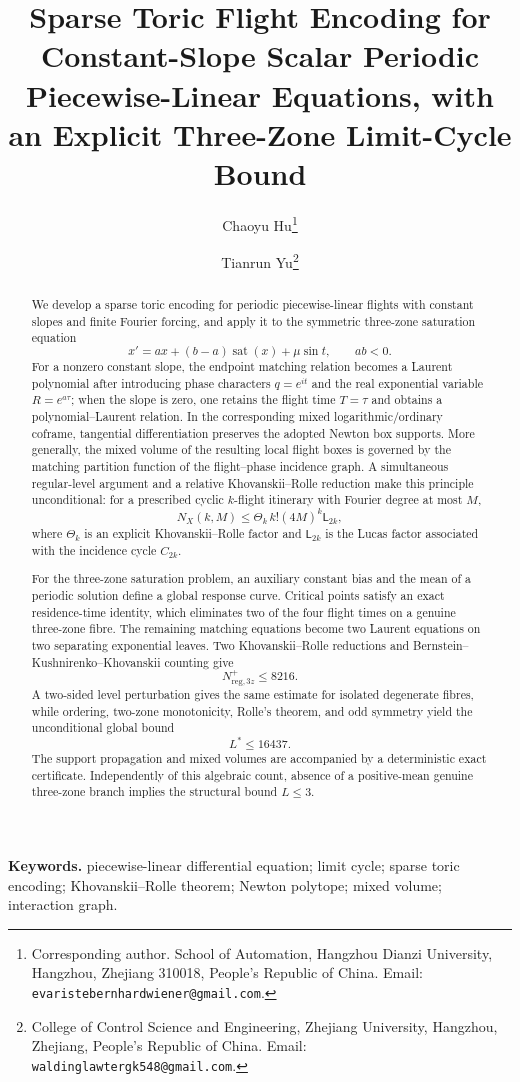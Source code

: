 \documentclass[11pt]{article}
\title{Sparse Toric Flight Encoding for Constant-Slope Scalar Periodic Piecewise-Linear Equations, with an Explicit Three-Zone Limit-Cycle Bound}
\author{Chaoyu Hu\thanks{Corresponding author. School of Automation, Hangzhou Dianzi University, Hangzhou, Zhejiang 310018, People's Republic of China. Email: \texttt{evaristebernhardwiener@gmail.com}.}
\and
Tianrun Yu\thanks{College of Control Science and Engineering, Zhejiang University, Hangzhou, Zhejiang, People's Republic of China. Email: \texttt{waldinglawtergk548@gmail.com}.}}
\date{}
\begin{document}
\maketitle

\begin{abstract}
We develop a sparse toric encoding for periodic piecewise-linear flights with constant slopes and finite Fourier forcing, and apply it to the symmetric three-zone saturation equation
\[
 x'=ax+(b-a)\operatorname{sat}(x)+\mu\sin t,
 \qquad ab<0.
\]
For a nonzero constant slope, the endpoint matching relation becomes a Laurent polynomial after introducing phase characters \(q=e^{it}\) and the real exponential variable \(R=e^{a\tau}\); when the slope is zero, one retains the flight time \(T=\tau\) and obtains a polynomial--Laurent relation.  In the corresponding mixed logarithmic/ordinary coframe, tangential differentiation preserves the adopted Newton box supports.  More generally, the mixed volume of the resulting local flight boxes is governed by the matching partition function of the flight--phase incidence graph.  A simultaneous regular-level argument and a relative Khovanskii--Rolle reduction make this principle unconditional: for a prescribed cyclic \(k\)-flight itinerary with Fourier degree at most \(M\),
\[
 N_X(k,M)\le \Theta_k\,k!(4M)^k\mathsf L_{2k},
\]
where \(\Theta_k\) is an explicit Khovanskii--Rolle factor and \(\mathsf L_{2k}\) is the Lucas factor associated with the incidence cycle \(C_{2k}\).

For the three-zone saturation problem, an auxiliary constant bias and the mean of a periodic solution define a global response curve.  Critical points satisfy an exact residence-time identity, which eliminates two of the four flight times on a genuine three-zone fibre.  The remaining matching equations become two Laurent equations on two separating exponential leaves.  Two Khovanskii--Rolle reductions and Bernstein--Kushnirenko--Khovanskii counting give
\[
 N_{\mathrm{reg},3z}^{+}\le8216.
\]
A two-sided level perturbation gives the same estimate for isolated degenerate fibres, while ordering, two-zone monotonicity, Rolle's theorem, and odd symmetry yield the unconditional global bound
\[
 \boxed{L^*\le16437}.
\]
The support propagation and mixed volumes are accompanied by a deterministic exact certificate.  Independently of this algebraic count, absence of a positive-mean genuine three-zone branch implies the structural bound \(L\le3\).
\end{abstract}

\medskip
\noindent\textbf{Keywords.} piecewise-linear differential equation; limit cycle; sparse toric encoding; Khovanskii--Rolle theorem; Newton polytope; mixed volume; interaction graph.
\end{document}
